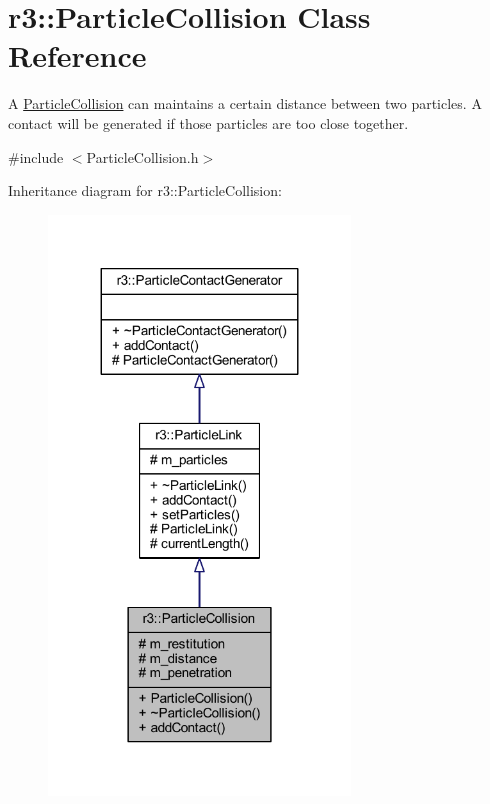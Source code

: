 \hypertarget{classr3_1_1_particle_collision}{}\section{r3\+:\+:Particle\+Collision Class Reference}
\label{classr3_1_1_particle_collision}


A \mbox{\hyperlink{classr3_1_1_particle_collision}{Particle\+Collision}} can maintains a certain distance between two particles. A contact will be generated if those particles are too close together.  




{\ttfamily \#include $<$Particle\+Collision.\+h$>$}



Inheritance diagram for r3\+:\+:Particle\+Collision\+:\nopagebreak
\begin{figure}[H]
\begin{center}
\leavevmode
\includegraphics[width=227pt]{classr3_1_1_particle_collision__inherit__graph}
\end{center}
\end{figure}


